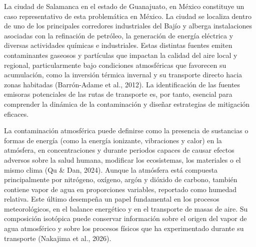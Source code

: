 La ciudad de Salamanca en el estado de Guanajuato, en México constituye un caso representativo de esta 
problemática en México. La ciudad se localiza dentro de uno de los 
principales corredores industriales del Bajío y alberga instalaciones 
asociadas con la refinación de petróleo, la generación de energía eléctrica
y diversas actividades químicas e industriales. Estas distintas fuentes emiten contaminantes
gaseosos y partículas que impactan la calidad del aire local y regional, 
particularmente bajo condiciones atmosféricas que favorecen su acumulación, como 
la inversión térmica invernal y su transporte directo
hacia zonas habitadas (Barrón-Adame et al., 2012). La identificación de las fuentes 
emisoras  potenciales de las rutas de transporte es, por tanto, esencial para comprender la dinámica
de la contaminación y diseñar estrategias de mitigación eficaces. 
 
La contaminación atmosférica puede definirse como la presencia de sustancias o 
formas de energía (como la energía ionizante, vibraciones y calor) en la atmósfera, en concentraciones y durante periodos capaces 
de causar efectos adversos sobre la salud humana, modificar los ecosistemas, los materiales o el mismo clima (Qu \& Dan, 2024). 
Aunque la atmósfera está compuesta principalmente por nitrógeno, oxígeno, argón y 
dióxido de carbono, también contiene vapor de agua en proporciones variables, reportado
como humedad relativa. Este 
último desempeña un papel fundamental en los procesos meteorológicos, en el balance 
energético y en el transporte de masas de aire. Su composición isotópica puede conservar 
información sobre el origen del vapor de agua atmosférico y sobre los procesos físicos que 
ha experimentado durante su transporte (Nakajima et al., 2026).


